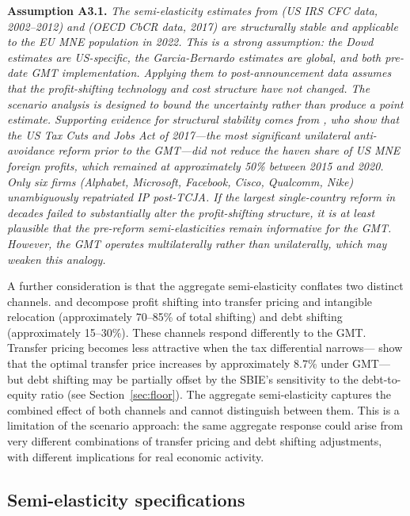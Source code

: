 \documentclass[11pt,a4paper]{article}
\newcommand{\assumption}[2]{\noindent\textbf{Assumption #1.} \textit{#2}\medskip}
\begin{document}
\assumption{A3.1}{The semi-elasticity estimates from \citet{dowd2017} (US IRS CFC data, 2002--2012) and \citet{garcia2024} (OECD CbCR data, 2017) are structurally stable and applicable to the EU MNE population in 2022. This is a strong assumption: the Dowd estimates are US-specific, the Garcia-Bernardo estimates are global, and both pre-date GMT implementation. Applying them to post-announcement data assumes that the profit-shifting technology and cost structure have not changed. The scenario analysis is designed to bound the uncertainty rather than produce a point estimate. Supporting evidence for structural stability comes from \citet{garcia2022}, who show that the US Tax Cuts and Jobs Act of 2017---the most significant unilateral anti-avoidance reform prior to the GMT---did not reduce the haven share of US MNE foreign profits, which remained at approximately 50\% between 2015 and 2020. Only six firms (Alphabet, Microsoft, Facebook, Cisco, Qualcomm, Nike) unambiguously repatriated IP post-TCJA. If the largest single-country reform in decades failed to substantially alter the profit-shifting structure, it is at least plausible that the pre-reform semi-elasticities remain informative for the GMT. However, the GMT operates multilaterally rather than unilaterally, which may weaken this analogy.}

A further consideration is that the aggregate semi-elasticity conflates two distinct channels. \citet{riedel2018} and \citet{torslov2022} decompose profit shifting into transfer pricing and intangible relocation (approximately 70--85\% of total shifting) and debt shifting (approximately 15--30\%). These channels respond differently to the GMT. Transfer pricing becomes less attractive when the tax differential narrows---\citet{schjelderup2024} show that the optimal transfer price increases by approximately 8.7\% under GMT---but debt shifting may be partially offset by the SBIE's sensitivity to the debt-to-equity ratio (see Section~\ref{sec:floor}). The aggregate semi-elasticity captures the combined effect of both channels and cannot distinguish between them. This is a limitation of the scenario approach: the same aggregate response could arise from very different combinations of transfer pricing and debt shifting adjustments, with different implications for real economic activity.

\subsection{Semi-elasticity specifications}\label{sec:elasticity}
\end{document}
